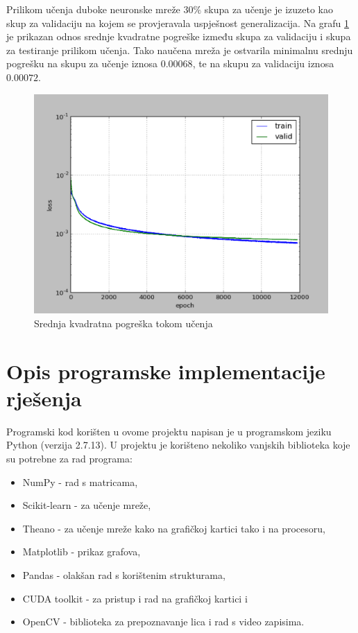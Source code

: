 \documentclass[times, utf8, zavrsni, numeric]{fer}
\begin{document}
Prilikom učenja duboke neuronske mreže $30\%$ skupa za učenje je izuzeto kao skup za validaciju na kojem se provjeravala uspješnost generalizacija. Na grafu \ref{fig:lc} je prikazan odnos srednje kvadratne pogreške između skupa za validaciju i skupa za testiranje prilikom učenja. Tako naučena mreža je ostvarila minimalnu srednju pogrešku na skupu za učenje iznosa $0.00068$, te na skupu za validaciju iznosa $0.00072$.

\begin{figure}[htb]
    \centering
    \includegraphics[width=14cm]{images/l_curves.png}
    \caption{Srednja kvadratna pogreška tokom učenja}
    \label{fig:lc}
\end{figure}

\chapter{Opis programske implementacije rješenja}

Programski kod korišten u ovome projektu napisan je u programskom jeziku Python (verzija 2.7.13). U projektu je korišteno nekoliko vanjskih biblioteka koje su potrebne za rad programa:
\begin{itemize}
    \item NumPy - rad s matricama,
    \item Scikit-learn - za učenje mreže,
    \item Theano - za učenje mreže kako na grafičkoj kartici tako i na procesoru,
    \item Matplotlib - prikaz grafova,
    \item Pandas - olakšan rad s korištenim strukturama,
    \item CUDA toolkit - za pristup i rad na grafičkoj kartici i
    \item OpenCV - biblioteka za prepoznavanje lica i rad s video zapisima.
\end{itemize}
\end{document}
